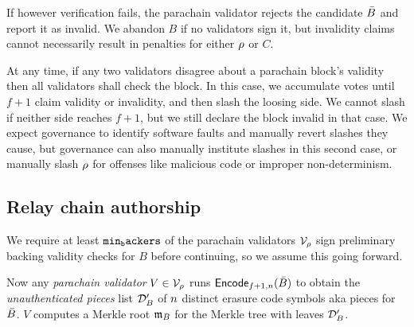 If however verification fails, the parachain validator rejects the candidate $\bar{B}$ and report it as invalid.  We abandon $B$ if no validators sign it, but invalidity claims cannot necessarily result in penalties for either $\rho$ or $C$.  

At any time, if any two validators disagree about a parachain block's validity then all validators shall check the block.  In this case, we accumulate votes until $f+1$ claim validity or invalidity, and then slash the loosing side.  We cannot slash if neither side reaches $f+1$, but we still declare the block invalid in that case.  We expect governance to identify software faults and manually revert slashes they cause, but governance can also manually institute slashes in this second case, or manually slash $\rho$ for offenses like malicious code or improper non-determinism. 


\subsection{Relay chain authorship} %
\label{sec:backing}


We require at least $\mathtt{min_backers}$ of the parachain validators $\mathcal{V}_{\rho}$ sign preliminary backing validity checks for $B$ before continuing, so we assume this going forward.

Now any {\em parachain validator} $V \in \mathcal{V}_{\rho}$ runs $\mathsf{Encode}_{f+1,n}(\bar{B})$ to obtain the {\em unauthenticated pieces} list $\mathcal{D}'_B$ of $n$ distinct erasure code symbols aka pieces for $\bar{B}$.  $V$ computes a Merkle root $\mathfrak{m}_B$ for the Merkle tree with leaves $\mathcal{D}'_B$.  

